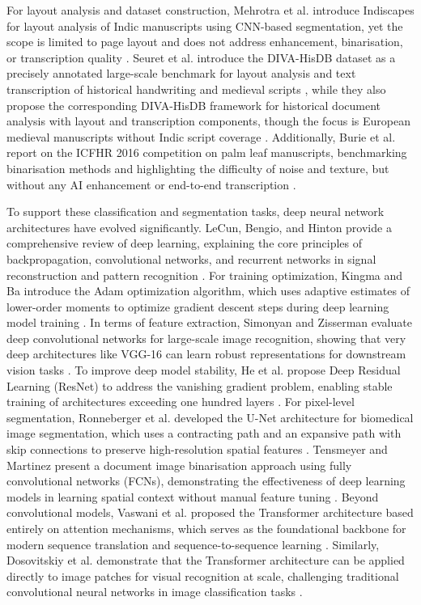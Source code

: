 For layout analysis and dataset construction, Mehrotra et al. introduce Indiscapes for layout analysis of Indic manuscripts using CNN-based segmentation, yet the scope is limited to page layout and does not address enhancement, binarisation, or transcription quality \cite{Mehrotra2022}. Seuret et al. introduce the DIVA-HisDB dataset as a precisely annotated large-scale benchmark for layout analysis and text transcription of historical handwriting and medieval scripts \cite{Seuret2016}, while they also propose the corresponding DIVA-HisDB framework for historical document analysis with layout and transcription components, though the focus is European medieval manuscripts without Indic script coverage \cite{Seuret2021}. Additionally, Burie et al. report on the ICFHR 2016 competition on palm leaf manuscripts, benchmarking binarisation methods and highlighting the difficulty of noise and texture, but without any AI enhancement or end-to-end transcription \cite{Burie2016}.

To support these classification and segmentation tasks, deep neural network architectures have evolved significantly. LeCun, Bengio, and Hinton provide a comprehensive review of deep learning, explaining the core principles of backpropagation, convolutional networks, and recurrent networks in signal reconstruction and pattern recognition \cite{LeCun2015}. For training optimization, Kingma and Ba introduce the Adam optimization algorithm, which uses adaptive estimates of lower-order moments to optimize gradient descent steps during deep learning model training \cite{Adam2015}. In terms of feature extraction, Simonyan and Zisserman evaluate deep convolutional networks for large-scale image recognition, showing that very deep architectures like VGG-16 can learn robust representations for downstream vision tasks \cite{VGG2015}. To improve deep model stability, He et al. propose Deep Residual Learning (ResNet) to address the vanishing gradient problem, enabling stable training of architectures exceeding one hundred layers \cite{ResNet2016}. For pixel-level segmentation, Ronneberger et al. developed the U-Net architecture for biomedical image segmentation, which uses a contracting path and an expansive path with skip connections to preserve high-resolution spatial features \cite{UNet2015}. Tensmeyer and Martinez present a document image binarisation approach using fully convolutional networks (FCNs), demonstrating the effectiveness of deep learning models in learning spatial context without manual feature tuning \cite{Tensmeyer2017}. Beyond convolutional models, Vaswani et al. proposed the Transformer architecture based entirely on attention mechanisms, which serves as the foundational backbone for modern sequence translation and sequence-to-sequence learning \cite{Vaswani2017}. Similarly, Dosovitskiy et al. demonstrate that the Transformer architecture can be applied directly to image patches for visual recognition at scale, challenging traditional convolutional neural networks in image classification tasks \cite{ViT2021}.

